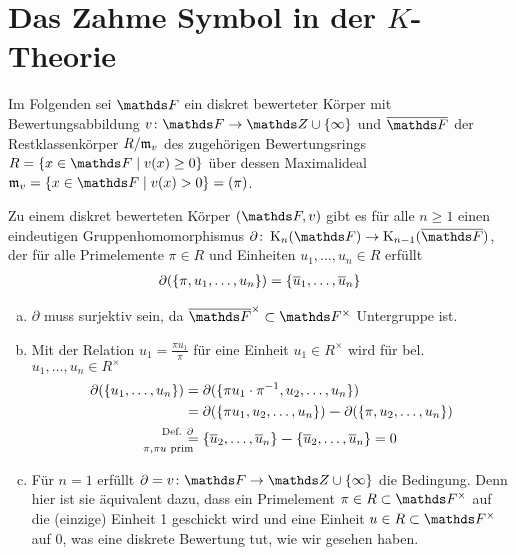\documentclass[ngerman,fontsize=11pt, paper=a4, parskip=half, titlepage=true, toc=bib]{scrartcl}
\begin{document}
\section{Das Zahme Symbol in der $K$-Theorie}
Im Folgenden sei $\F$ ein diskret bewerteter Körper mit
Bewertungsabbildung $v\colon \F\to\Z\cup\{\infty\}$ und
$\overline{\F}$ der Restklassenkörper $R/\mathfrak{m}_v$ 
des zugehörigen Bewertungsrings $R=\left\{x\in\F\mid v(x)\geq0\right\}$
über dessen Maximalideal $\frakm_v=\left\{x\in\F\mid v(x)>0\right\}=(\pi)$.

\begin{Satz}\label{zahmessymbolhom}
  Zu einem diskret bewerteten Körper $(\F,v)$ gibt es für alle $n\geq 1$
  einen eindeutigen Gruppenhomomorphismus 
  $\partial\colon \KnF\to \K_{n-1}(\bF)$,
  der für alle Primelemente $\pi\in R$ und 
  Einheiten $u_1,\dotsc, u_n\in R$ erfüllt
  \begin{gather*}
    \partial(\{\pi,u_1,\dotsc,u_n\})=\{\overline u_1, \dotsc, \overline u_n\}
  \end{gather*}
\end{Satz}


\begin{Bem}\label{bemzahmessymbolhom}
  \begin{enumerate}[a)]
  \item   $\partial$ muss surjektiv sein, da $\ov\F^\times\subset \Fx$
    Untergruppe ist.
  \item   Mit der Relation $u_1=\frac{\pi u_1}{\pi}$ 
    für eine Einheit $u_1\in R^\times$
    wird für bel. $u_1,\dotsc, u_n\in R^\times$
    \begin{align*}
      \partial(\{u_1,\dotsc,u_n\})
      &= \partial(\{\pi u_1\cdot \pi^{-1},u_2,\dotsc,u_n\})\\
      &= \partial(\{\pi u_1,u_2,\dotsc,u_n\})\m 
        \partial(\{\pi,u_2,\dotsc,u_n\})\\
      &\overset{\mathllap{\text{Def. }\partial}}{
        \underset{\mathllap{\pi,\pi u\text{ prim}}}{=}}
        \{\ov u_2,\dotsc, \ov u_n\} \m \{\ov u_2,\dotsc, \ov u_n\}
        = 0
    \end{align*}
  \item Für $n=1$ erfüllt $\partial=v\colon \F\to \Z\cup\{\infty\}$ die Bedingung.
    Denn hier ist sie äquivalent dazu, dass ein Primelement 
    $\pi\in R\subset \Fx$ auf die (einzige) Einheit 1 
    geschickt wird und eine Einheit $u\in R\subset \Fx$ auf 0,
    was eine diskrete Bewertung tut, wie wir gesehen haben.
  \end{enumerate}
\end{Bem}
\end{document}
